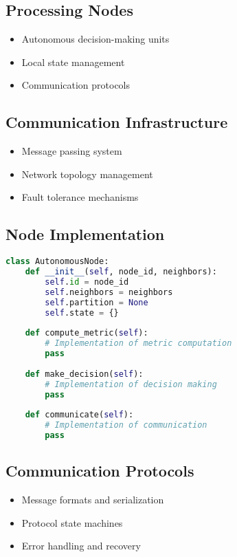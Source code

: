 \subsection{Processing Nodes}
\begin{itemize}
    \item Autonomous decision-making units
    \item Local state management
    \item Communication protocols
\end{itemize}

\subsection{Communication Infrastructure}
\begin{itemize}
    \item Message passing system
    \item Network topology management
    \item Fault tolerance mechanisms
\end{itemize}

\subsection{Node Implementation}
\begin{lstlisting}[language=Python]
class AutonomousNode:
    def __init__(self, node_id, neighbors):
        self.id = node_id
        self.neighbors = neighbors
        self.partition = None
        self.state = {}
    
    def compute_metric(self):
        # Implementation of metric computation
        pass
    
    def make_decision(self):
        # Implementation of decision making
        pass
    
    def communicate(self):
        # Implementation of communication
        pass
\end{lstlisting}

\subsection{Communication Protocols}
\begin{itemize}
    \item Message formats and serialization
    \item Protocol state machines
    \item Error handling and recovery
\end{itemize}

